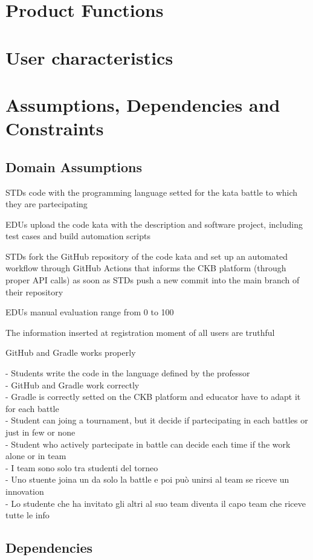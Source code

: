 {\color{red}
\section{Product Functions}
\section{User characteristics}
\section{Assumptions, Dependencies and Constraints}
\subsection{Domain Assumptions}
    \begin{assumptionsenumerate}
        \item STDs code with the programming language setted for the kata battle to which they are partecipating
        \item EDUs upload the code kata with the description and software project, including test cases and build automation scripts
        \item STDs fork the GitHub repository of the code kata and set up an automated workflow through GitHub Actions that informs the CKB platform (through proper API calls) as soon as STDs push a new commit into the main branch of their repository
        \item EDUs manual evaluation range from 0 to 100
        \item The information inserted at registration moment of all users are truthful
        \item GitHub and Gradle works properly
    \end{assumptionsenumerate}

- Students write the code in the language defined by the professor \\
- GitHub and Gradle work correctly \\
- Gradle is correctly setted on the CKB platform and educator have to adapt it for each battle \\
- Student can joing a tournament, but it decide if partecipating in each battles or just in few or none \\
- Student who actively partecipate in battle can decide each time if the work alone or in team \\
- I team sono solo tra studenti del torneo \\
- Uno stuente joina un da solo la battle e poi può unirsi al team se riceve un innovation \\
- Lo studente che ha invitato gli altri al suo team diventa il capo team che riceve tutte le info \\
\subsection{Dependencies}
}
